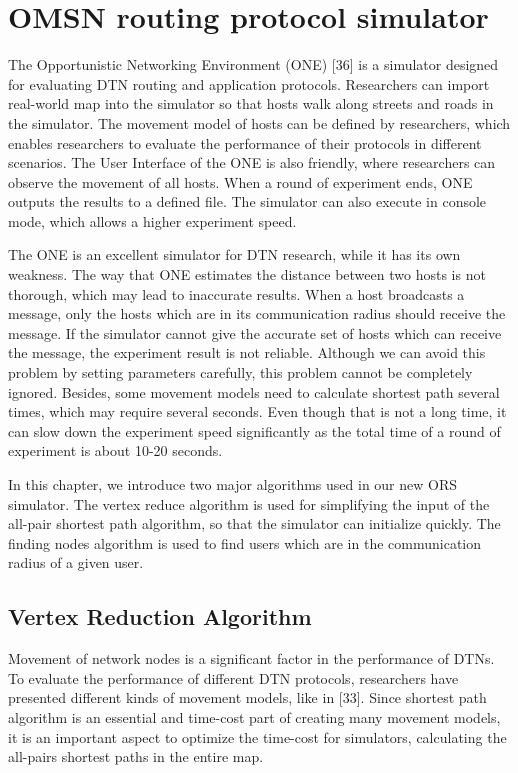 


\chapter{ OMSN routing protocol simulator}
\label{OPS}

\noindent The Opportunistic Networking Environment (ONE) [36] is a simulator designed for evaluating DTN routing and application protocols. Researchers can import real-world map into the simulator so that hosts walk along streets and roads in the simulator. The movement model of hosts can be defined by researchers, which enables researchers to evaluate the performance of their protocols in different scenarios. The User Interface of the ONE is also friendly, where researchers can observe the movement of all hosts. When a round of experiment ends, ONE outputs the results to a defined file. The simulator can also execute in console mode, which allows a higher experiment speed.

The ONE is an excellent simulator for DTN research, while it has its own weakness. The way that ONE estimates the distance between two hosts is not thorough, which may lead to inaccurate results. When a host broadcasts a message, only the hosts which are in its communication radius should receive the message. If the simulator cannot give the accurate set of hosts which can receive the message, the experiment result is not reliable. Although we can avoid this problem by setting parameters carefully, this problem cannot be completely ignored. Besides, some movement models need to calculate shortest path several times, which may require several seconds. Even though that is not a long time, it can slow down the experiment speed significantly as the total time of a round of experiment is about 10-20 seconds. 

In this chapter, we introduce two major algorithms used in our new ORS simulator. The vertex reduce algorithm is used for simplifying the input of the all-pair shortest path algorithm, so that the simulator can initialize quickly. The finding nodes algorithm is used to find users which are in the communication radius of a given user.


\section{ Vertex Reduction Algorithm}

\noindent Movement of network nodes is a significant factor in the performance of DTNs. To evaluate the performance of different DTN protocols, researchers have presented different kinds of movement models, like in [33]. Since shortest path algorithm is an essential and time-cost part of creating many movement models, it is an important aspect to optimize the time-cost for simulators, calculating the all-pairs shortest paths in the entire map.

